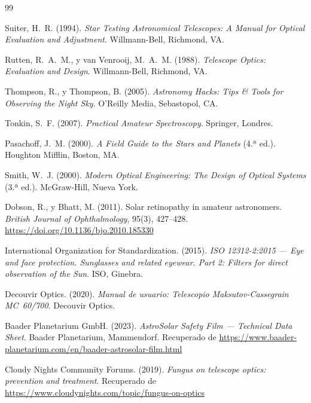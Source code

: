 \documentclass[12pt,oneside]{book}
\begin{document}
\begin{thebibliography}{99}

Suiter, H.~R. (1994).
\textit{Star Testing Astronomical Telescopes: A Manual for Optical Evaluation and Adjustment}.
Willmann-Bell, Richmond, VA.

Rutten, R.~A.~M., y van Venrooij, M.~A.~M. (1988).
\textit{Telescope Optics: Evaluation and Design}.
Willmann-Bell, Richmond, VA.

Thompson, R., y Thompson, B. (2005).
\textit{Astronomy Hacks: Tips \& Tools for Observing the Night Sky}.
O'Reilly Media, Sebastopol, CA.

Tonkin, S.~F. (2007).
\textit{Practical Amateur Spectroscopy}.
Springer, Londres.

Pasachoff, J.~M. (2000).
\textit{A Field Guide to the Stars and Planets} (4.ª ed.).
Houghton Mifflin, Boston, MA.

Smith, W.~J. (2000).
\textit{Modern Optical Engineering: The Design of Optical Systems} (3.ª ed.).
McGraw-Hill, Nueva York.

Dobson, R., y Bhatt, M. (2011).
Solar retinopathy in amateur astronomers.
\textit{British Journal of Ophthalmology}, 95(3), 427–428.
\url{https://doi.org/10.1136/bjo.2010.185330}

International Organization for Standardization. (2015).
\textit{ISO 12312-2:2015 — Eye and face protection. Sunglasses and related eyewear.
Part 2: Filters for direct observation of the Sun}.
ISO, Ginebra.

Decouvir Optics. (2020).
\textit{Manual de usuario: Telescopio Maksutov-Cassegrain MC~60/700}.
Decouvir Optics.

Baader Planetarium GmbH. (2023).
\textit{AstroSolar Safety Film — Technical Data Sheet}.
Baader Planetarium, Mammendorf.
Recuperado de \url{https://www.baader-planetarium.com/en/baader-astrosolar-film.html}

Cloudy Nights Community Forums. (2019).
\textit{Fungus on telescope optics: prevention and treatment}.
Recuperado de \url{https://www.cloudynights.com/topic/fungus-on-optics}

\end{thebibliography}
\end{document}
